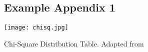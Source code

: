 \documentclass{imc-inf}
\begin{document}
%
%
%
%
%

\backmatter%
	
 \typeout{}
	
	

\begin{appendices} %
\chapter{Example Appendix 1}

\begin{table}
    \centering
    \texttt{[image: chisq.jpg]}
    \caption{Chi-Square Distribution Table. Adapted from \cite{Freedman_2007}}
    \label{chisq_dist_table}
\end{table}



	
\end{appendices}
\end{document}
